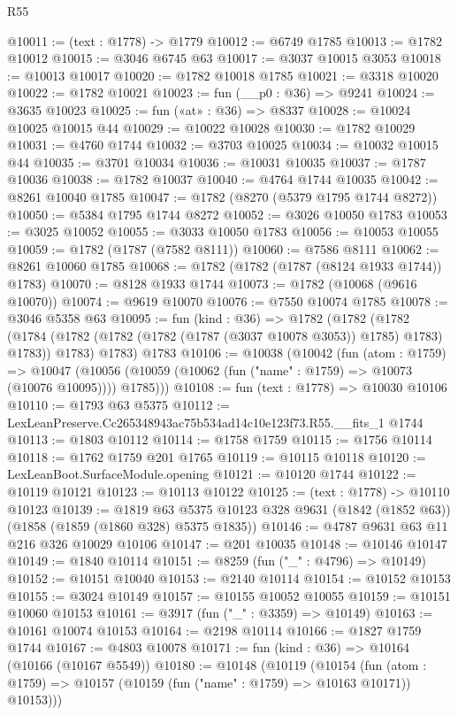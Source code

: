 \begin{lexlean}{R55}
\begin{coremodule}
@10011 := (text : @1778) -> @1779
@10012 := @6749 @1785
@10013 := @1782 @10012
@10015 := @3046 @6745 @63
@10017 := @3037 @10015 @3053
@10018 := @10013 @10017
@10020 := @1782 @10018 @1785
@10021 := @3318 @10020
@10022 := @1782 @10021
@10023 := fun (__p0 : @36) => @9241
@10024 := @3635 @10023
@10025 := fun («at» : @36) => @8337
@10028 := @10024 @10025 @10015 @44
@10029 := @10022 @10028
@10030 := @1782 @10029
@10031 := @4760 @1744
@10032 := @3703 @10025
@10034 := @10032 @10015 @44
@10035 := @3701 @10034
@10036 := @10031 @10035
@10037 := @1787 @10036
@10038 := @1782 @10037
@10040 := @4764 @1744 @10035
@10042 := @8261 @10040 @1785
@10047 := @1782 (@8270 (@5379 @1795 @1744 @8272))
@10050 := @5384 @1795 @1744 @8272
@10052 := @3026 @10050 @1783
@10053 := @3025 @10052
@10055 := @3033 @10050 @1783
@10056 := @10053 @10055
@10059 := @1782 (@1787 (@7582 @8111))
@10060 := @7586 @8111
@10062 := @8261 @10060 @1785
@10068 := @1782 (@1782 (@1787 (@8124 @1933 @1744)) @1783)
@10070 := @8128 @1933 @1744
@10073 := @1782 (@10068 (@9616 @10070))
@10074 := @9619 @10070
@10076 := @7550 @10074 @1785
@10078 := @3046 @5358 @63
@10095 := fun (kind : @36) =>
  @1782
    (@1782
      (@1782 (@1784 (@1782 (@1782 (@1782 (@1787 (@3037 @10078 @3053)) @1785) @1783) @1783)) @1783)
      @1783)
    @1783
@10106 := @10038
    (@10042
      (fun (atom : @1759) =>
      @10047 (@10056 (@10059 (@10062 (fun ("name" : @1759) => @10073 (@10076 @10095)))) @1785)))
@10108 := fun (text : @1778) => @10030 @10106
@10110 := @1793 @63 @5375
@10112 := LexLeanPreserve.Cc265348943ac75b534ad14c10e123f73.R55.__fits_1 @1744
@10113 := @1803 @10112
@10114 := @1758 @1759
@10115 := @1756 @10114
@10118 := @1762 @1759 @201 @1765
@10119 := @10115 @10118
@10120 := LexLeanBoot.SurfaceModule.opening
@10121 := @10120 @1744
@10122 := @10119 @10121
@10123 := @10113 @10122
@10125 := (text : @1778) -> @10110 @10123
@10139 := @1819
    @63
    @5375
    @10123
    @328
    @9631
    (@1842 (@1852 @63))
    (@1858 (@1859 (@1860 @328) @5375 @1835))
@10146 := @4787 @9631 @63 @11 @216 @326 @10029 @10106
@10147 := @201 @10035
@10148 := @10146 @10147
@10149 := @1840 @10114
@10151 := @8259 (fun ("_" : @4796) => @10149)
@10152 := @10151 @10040
@10153 := @2140 @10114
@10154 := @10152 @10153
@10155 := @3024 @10149
@10157 := @10155 @10052 @10055
@10159 := @10151 @10060 @10153
@10161 := @3917 (fun ("_" : @3359) => @10149)
@10163 := @10161 @10074 @10153
@10164 := @2198 @10114
@10166 := @1827 @1759 @1744
@10167 := @4803 @10078
@10171 := fun (kind : @36) => @10164 (@10166 (@10167 @5549))
@10180 := @10148
    (@10119
      (@10154
        (fun (atom : @1759) => @10157 (@10159 (fun ("name" : @1759) => @10163 @10171)) @10153)))

\end{coremodule}
\end{lexlean}
